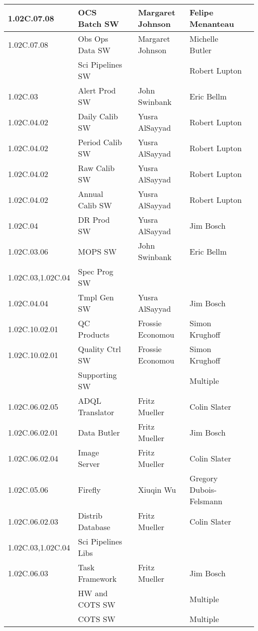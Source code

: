 \begin{longtable}{|p{}|p{}|p{}|p{}|p{}|p{}|}
1.02C.07.08 &  OCS Batch SW &  & Margaret Johnson & Felipe Menanteau & \\ \hline
1.02C.07.08 &  Obs Ops Data SW &  & Margaret Johnson & Michelle Butler & \\ \hline
 &  Sci Pipelines SW &  &  & Robert Lupton & \\ \hline
1.02C.03 &  Alert Prod SW &  & John Swinbank & Eric Bellm & \\ \hline
1.02C.04.02 &  Daily Calib SW &  & Yusra AlSayyad & Robert Lupton & \\ \hline
1.02C.04.02 &  Period Calib SW &  & Yusra AlSayyad & Robert Lupton & \\ \hline
1.02C.04.02 &  Raw Calib SW &  & Yusra AlSayyad & Robert Lupton & \\ \hline
1.02C.04.02 &  Annual Calib SW &  & Yusra AlSayyad & Robert Lupton & \\ \hline
1.02C.04 &  DR Prod SW &  & Yusra AlSayyad & Jim Bosch & \\ \hline
1.02C.03.06 &  MOPS SW &  & John Swinbank & Eric Bellm & \\ \hline
1.02C.03,1.02C.04 &  Spec Prog SW &  &  &  & \\ \hline
1.02C.04.04 &  Tmpl Gen SW &  & Yusra AlSayyad & Jim Bosch & \\ \hline
1.02C.10.02.01 &  QC Products &  & Frossie Economou & Simon Krughoff & \\ \hline
1.02C.10.02.01 &  Quality Ctrl SW &  & Frossie Economou & Simon Krughoff & \\ \hline
 &  Supporting SW &  &  & Multiple & \\ \hline
1.02C.06.02.05 &  ADQL Translator &  & Fritz Mueller & Colin Slater & \\ \hline
1.02C.06.02.01 &  Data Butler &  & Fritz Mueller & Jim Bosch & \\ \hline
1.02C.06.02.04 &  Image Server &  & Fritz Mueller & Colin Slater & \\ \hline
1.02C.05.06 &  Firefly &  & Xiuqin Wu & Gregory Dubois-Felsmann & \\ \hline
1.02C.06.02.03 &  Distrib Database &  & Fritz Mueller & Colin Slater & \\ \hline
1.02C.03,1.02C.04 &  Sci Pipelines Libs &  &  &  & \\ \hline
1.02C.06.03 &  Task Framework &  & Fritz Mueller & Jim Bosch & \\ \hline
 &  HW and COTS SW &  &  & Multiple & \\ \hline
 &  COTS SW &  &  & Multiple & \\ \hline

\end{longtable}
